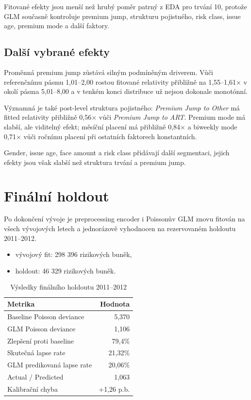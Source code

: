 \documentclass[11pt,a4paper]{article}
\theoremstyle{definition}
\begin{document}
Fitované efekty jsou menší než hrubý poměr patrný z EDA pro trvání 10, protože GLM současně kontroluje premium jump, strukturu pojistného, risk class, issue age, premium mode a další faktory.

\subsection{Další vybrané efekty}
Proměnná premium jump zůstává silným podmíněným driverem. Vůči referenčnímu pásmu 1,01--2,00 rostou fitované relativity přibližně na 1,55--1,61$\times$ v okolí pásma 5,01--8,00 a v tenkém konci distribuce už nejsou dokonale monotónní.

Významná je také post-level struktura pojistného: \textit{Premium Jump to Other} má fitted relativity přibližně 0,56$\times$ vůči \textit{Premium Jump to ART}. Premium mode má slabší, ale viditelný efekt; měsíční placení má přibližně 0,84$\times$ a biweekly mode 0,71$\times$ vůči ročnímu placení při ostatních faktorech konstantních.

Gender, issue age, face amount a risk class přidávají další segmentaci, jejich efekty jsou však slabší než struktura trvání a premium jump.

\section{Finální holdout}
Po dokončení vývoje je preprocessing encoder i Poissonův GLM znovu fitován na všech vývojových letech a jednorázově vyhodnocen na rezervovaném holdoutu 2011--2012.

\begin{itemize}
\item vývojový fit: 298 396 rizikových buněk,
\item holdout: 46 329 rizikových buněk.
\end{itemize}

\begin{table}[H]
\centering
\caption{Výsledky finálního holdoutu 2011--2012}
\begin{tabular}{lr}
\toprule
Metrika & Hodnota \\
\midrule
Baseline Poisson deviance & 5,370 \\
GLM Poisson deviance & 1,106 \\
Zlepšení proti baseline & 79,4\% \\
Skutečná lapse rate & 21,32\% \\
GLM predikovaná lapse rate & 20,06\% \\
Actual / Predicted & 1,063 \\
Kalibrační chyba & +1,26 p.b. \\
\bottomrule
\end{tabular}
\end{table}
\end{document}
